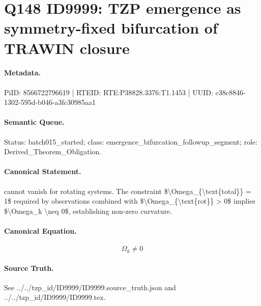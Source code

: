 \section*{Q148 ID9999: TZP emergence as symmetry-fixed bifurcation of TRAWIN closure}
\paragraph{Metadata.}
PiID: 8566722796619 | RTEID: RTE:P38828.3376:T1.1453 | UUID: c38c8846-1302-595d-b046-a3fc30985aa1

\paragraph{Semantic Queue.}
Status: batch015\_started; class: emergence\_bifurcation\_followup\_segment; role: Derived\_Theorem\_Obligation.

\paragraph{Canonical Statement.}
cannot vanish for rotating systems. The constraint \$\textbackslash{}Omega\_\{\textbackslash{}text\{total\}\} = 1\$ required by observations combined with \$\textbackslash{}Omega\_\{\textbackslash{}text\{rot\}\} > 0\$ implies \$\textbackslash{}Omega\_k \textbackslash{}neq 0\$, establishing non-zero curvature.

\paragraph{Canonical Equation.}
\[
\Omega_k \neq 0
\]

\paragraph{Source Truth.}
See ../../tzp\_id/ID9999/ID9999.source\_truth.json and ../../tzp\_id/ID9999/ID9999.tex.
